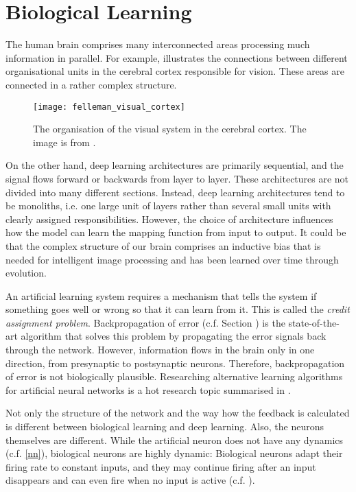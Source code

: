 \section{Biological Learning}
The human brain comprises many interconnected areas processing much information in parallel.
For example,  illustrates the connections between different organisational units in the cerebral cortex responsible for vision.
These areas are connected in a rather complex structure.
\begin{figure}[h]
    \centering
    \texttt{[image: felleman\_visual\_cortex]}
    \caption[Organization of the visual system in the cerebral cortex]{The organisation of the visual system in the cerebral cortex. The image is from .}
\end{figure}
On the other hand, deep learning architectures are primarily sequential, and the signal flows forward or backwards from layer to layer.
These architectures are not divided into many different sections. Instead, deep learning architectures tend to be monoliths, i.e. one large unit of layers rather than several small units with clearly assigned responsibilities.
However, the choice of architecture influences how the model can learn the mapping function from input to output.
It could be that the complex structure of our brain comprises an inductive bias that is needed for intelligent image processing and has been learned over time through evolution.

An artificial learning system requires a mechanism that tells the system if something goes well or wrong so that it can learn from it.
This is called the \emph{credit assignment problem}.
Backpropagation of error (c.f. Section ) is the state-of-the-art algorithm that solves this problem by propagating the error signals back through the network.
However, information flows in the brain only in one direction, from presynaptic to postsynaptic neurons.
Therefore, backpropagation of error is not biologically plausible.
Researching alternative learning algorithms for artificial neural networks is a hot research topic summarised in .

Not only the structure of the network and the way how the feedback is calculated is different between biological learning and deep learning.
Also, the neurons themselves are different.
While the artificial neuron does not have any dynamics (c.f. \eqref{nn}), biological neurons are highly dynamic:
Biological neurons adapt their firing rate to constant inputs, and they may continue firing after an input disappears and can even fire when no input is active (c.f. ).

